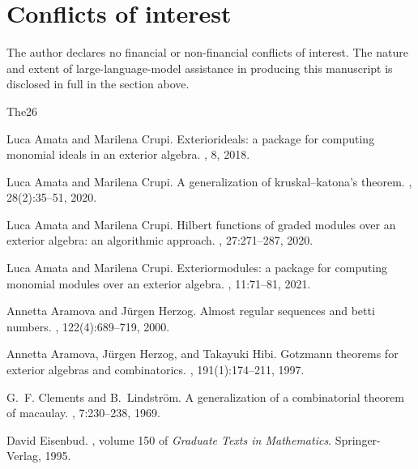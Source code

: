 \documentclass[11pt, a4paper, abstract=yes]{scrartcl}
\theoremstyle{definition}
\theoremstyle{remark}
\theoremstyle{plain}
\begin{document}
\section*{Conflicts of interest}
\label{sec:org775c580}
The author declares no financial or non-financial conflicts of interest. The nature and extent of
large-language-model assistance in producing this manuscript is disclosed in full in the section
above.
\begin{thebibliography}{{The}26}

Luca Amata and Marilena Crupi.
\newblock Exteriorideals: a package for computing monomial ideals in an
  exterior algebra.
, 8, 2018.

Luca Amata and Marilena Crupi.
\newblock A generalization of kruskal--katona's theorem.
, 28(2):35--51, 2020.

Luca Amata and Marilena Crupi.
\newblock Hilbert functions of graded modules over an exterior algebra: an
  algorithmic approach.
, 27:271--287, 2020.

Luca Amata and Marilena Crupi.
\newblock Exteriormodules: a package for computing monomial modules over an
  exterior algebra.
, 11:71--81, 2021.

Annetta Aramova and J{\"u}rgen Herzog.
\newblock Almost regular sequences and betti numbers.
, 122(4):689--719, 2000.

Annetta Aramova, J{\"u}rgen Herzog, and Takayuki Hibi.
\newblock Gotzmann theorems for exterior algebras and combinatorics.
, 191(1):174--211, 1997.

G.~F. Clements and B.~Lindstr{\"o}m.
\newblock A generalization of a combinatorial theorem of macaulay.
, 7:230--238, 1969.

David Eisenbud.
,
  volume 150 of {\em Graduate Texts in Mathematics}.
\newblock Springer-Verlag, 1995.


\end{thebibliography}
\end{document}
